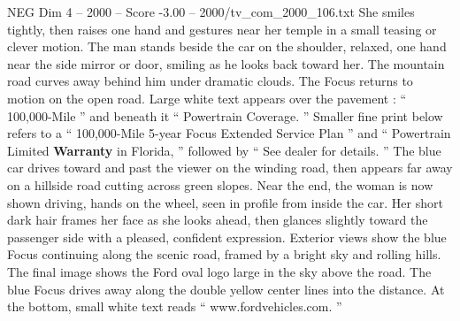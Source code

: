 \begin{textsample}{NEG Dim 4 – 2000 – Score -3.00 – 2000/tv\_com\_2000\_106.txt}
She smiles tightly, then raises one hand and gestures near her temple in a small teasing or clever motion.
The man stands beside the car on the shoulder, relaxed, one hand near the side mirror or door, smiling as he looks back toward her.
The mountain road curves away behind him under dramatic clouds.
The Focus returns to motion on the open road.
Large white text appears over the pavement : “ 100,000-Mile ” and beneath it “ Powertrain Coverage. ” Smaller fine print below refers to a “ 100,000-Mile 5-year Focus Extended Service Plan ” and “ Powertrain Limited \textbf{Warranty} in Florida, ” followed by “ See dealer for details. ” The blue car drives toward and past the viewer on the winding road, then appears far away on a hillside road cutting across green slopes.
Near the end, the woman is now shown driving, hands on the wheel, seen in profile from inside the car.
Her short dark hair frames her face as she looks ahead, then glances slightly toward the passenger side with a pleased, confident expression.
Exterior views show the blue Focus continuing along the scenic road, framed by a bright sky and rolling hills.
The final image shows the Ford oval logo large in the sky above the road.
The blue Focus drives away along the double yellow center lines into the distance.
At the bottom, small white text reads “ www.fordvehicles.com. ”

\end{textsample}
